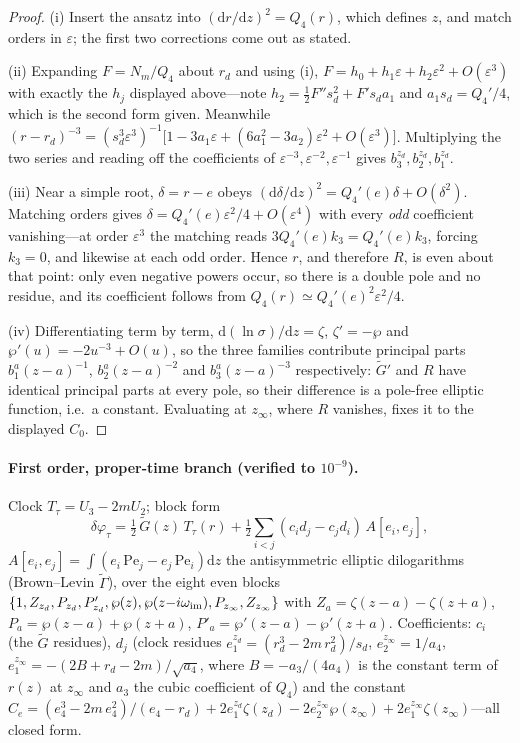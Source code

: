 \documentclass[12pt]{iopart}
\newcommand{\dd}{\mathrm{d}}
\theoremstyle{plain}
\theoremstyle{definition}
\theoremstyle{plain}
\theoremstyle{remark}
\begin{document}
\begin{proof}
(i) Insert the ansatz into $(\dd r/\dd z)^2=Q_4(r)$, which defines $z$, and match orders in
$\varepsilon$; the first two corrections come out as stated.

(ii) Expanding $F=N_m/Q_4$ about $r_d$ and using (i),
$F=h_0+h_1\varepsilon+h_2\varepsilon^2+O(\varepsilon^3)$ with exactly the $h_j$ displayed
above---note $h_2=\tfrac12F''s_d^2+F's_da_1$ and $a_1s_d=Q_4'/4$, which is the second form
given. Meanwhile
$(r-r_d)^{-3}=(s_d^3\varepsilon^3)^{-1}\big[1-3a_1\varepsilon+(6a_1^2-3a_2)\varepsilon^2
+O(\varepsilon^3)\big]$. Multiplying the two series and reading off the coefficients of
$\varepsilon^{-3},\varepsilon^{-2},\varepsilon^{-1}$ gives $b_3^{z_d},b_2^{z_d},b_1^{z_d}$.

(iii) Near a simple root, $\delta=r-e$ obeys $(\dd\delta/\dd z)^2=Q_4'(e)\delta+O(\delta^2)$.
Matching orders gives $\delta=Q_4'(e)\varepsilon^2/4+O(\varepsilon^4)$ with every
\emph{odd} coefficient vanishing---at order $\varepsilon^3$ the matching reads
$3Q_4'(e)k_3=Q_4'(e)k_3$, forcing $k_3=0$, and likewise at each odd order. Hence $r$, and
therefore $R$, is even about that point: only even negative powers occur, so there is a
double pole and no residue, and its coefficient follows from
$Q_4(r)\simeq Q_4'(e)^2\varepsilon^2/4$.

(iv) Differentiating term by term, $\dd(\ln\sigma)/\dd z=\zeta$, $\zeta'=-\wp$ and
$\wp'(u)=-2u^{-3}+O(u)$, so the three families contribute principal parts
$b_1^a(z-a)^{-1}$, $b_2^a(z-a)^{-2}$ and $b_3^a(z-a)^{-3}$ respectively: $\tilde G'$ and
$R$ have identical principal parts at every pole, so their difference is a pole-free
elliptic function, i.e.\ a constant. Evaluating at $z_\infty$, where $R$ vanishes, fixes it
to the displayed $C_0$.
\end{proof}

\paragraph{First order, proper-time branch (verified to $10^{-9}$).}
Clock $T_\tau=U_3-2mU_2$; block form
\begin{equation}
\delta\varphi_\tau=\tfrac12\,\tilde G(z)\,T_\tau(r)
+\tfrac12\sum_{i<j}(c_i d_j-c_j d_i)\,A[e_i,e_j],
\end{equation}
$A[e_i,e_j]=\int(e_i\,\mathrm{Pe}_j-e_j\,\mathrm{Pe}_i)\dd z$ the antisymmetric
elliptic dilogarithms (Brown--Levin $\tilde\Gamma$), over the eight even blocks
$\{1,Z_{z_d},P_{z_d},P'_{z_d},\wp(z),\wp(z{-}i\omega_{\rm im}),P_{z_\infty},
Z_{z_\infty}\}$ with $Z_a=\zeta(z{-}a)-\zeta(z{+}a)$,
$P_a=\wp(z{-}a)+\wp(z{+}a)$, $P'_a=\wp'(z{-}a)-\wp'(z{+}a)$. Coefficients: $c_i$ (the
$\tilde G$ residues), $d_j$ (clock residues $e_1^{z_d}=(r_d^3-2m\,r_d^2)/s_d$,
$e_2^{z_\infty}=1/a_4$, $e_1^{z_\infty}=-(2B+r_d-2m)/\sqrt{a_4}$, where
$B=-a_3/(4a_4)$ is the constant term of $r(z)$ at $z_\infty$ and $a_3$ the cubic
coefficient of $Q_4$) and the constant
$C_e=(e_4^3-2m\,e_4^2)/(e_4-r_d)+2e_1^{z_d}\zeta(z_d)-2e_2^{z_\infty}\wp(z_\infty)
+2e_1^{z_\infty}\zeta(z_\infty)$---all closed form.
\end{document}
